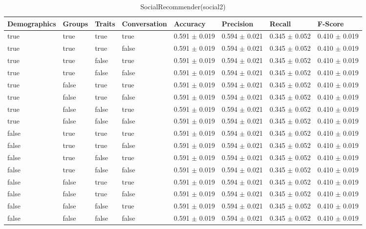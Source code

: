\clearpage
\begin{table}[h]
	\centering
	\begin{tabular}{|l|l|l|l|l|l|l|l|} %
	\hline
	Demographics & Groups & Traits & Conversation & Accuracy & Precision & Recall & F-Score \\ \hline
	true & true & true & true & 0.591	\( \pm \) 0.019	& 0.594	\( \pm \) 0.021	& 0.345	\( \pm \) 0.052	& 0.410	\( \pm \) 0.019	\\ \hline
	true & true & true & false & 0.591	\( \pm \) 0.019	& 0.594	\( \pm \) 0.021	& 0.345	\( \pm \) 0.052	& 0.410	\( \pm \) 0.019	\\ \hline
	true & true & false & true & 0.591	\( \pm \) 0.019	& 0.594	\( \pm \) 0.021	& 0.345	\( \pm \) 0.052	& 0.410	\( \pm \) 0.019	\\ \hline
	true & true & false & false & 0.591	\( \pm \) 0.019	& 0.594	\( \pm \) 0.021	& 0.345	\( \pm \) 0.052	& 0.410	\( \pm \) 0.019	\\ \hline
	true & false & true & true & 0.591	\( \pm \) 0.019	& 0.594	\( \pm \) 0.021	& 0.345	\( \pm \) 0.052	& 0.410	\( \pm \) 0.019	\\ \hline
	true & false & true & false & 0.591	\( \pm \) 0.019	& 0.594	\( \pm \) 0.021	& 0.345	\( \pm \) 0.052	& 0.410	\( \pm \) 0.019	\\ \hline
	true & false & false & true & 0.591	\( \pm \) 0.019	& 0.594	\( \pm \) 0.021	& 0.345	\( \pm \) 0.052	& 0.410	\( \pm \) 0.019	\\ \hline
	true & false & false & false & 0.591	\( \pm \) 0.019	& 0.594	\( \pm \) 0.021	& 0.345	\( \pm \) 0.052	& 0.410	\( \pm \) 0.019	\\ \hline
	false & true & true & true & 0.591	\( \pm \) 0.019	& 0.594	\( \pm \) 0.021	& 0.345	\( \pm \) 0.052	& 0.410	\( \pm \) 0.019	\\ \hline
	false & true & true & false & 0.591	\( \pm \) 0.019	& 0.594	\( \pm \) 0.021	& 0.345	\( \pm \) 0.052	& 0.410	\( \pm \) 0.019	\\ \hline
	false & true & false & true & 0.591	\( \pm \) 0.019	& 0.594	\( \pm \) 0.021	& 0.345	\( \pm \) 0.052	& 0.410	\( \pm \) 0.019	\\ \hline
	false & true & false & false & 0.591	\( \pm \) 0.019	& 0.594	\( \pm \) 0.021	& 0.345	\( \pm \) 0.052	& 0.410	\( \pm \) 0.019	\\ \hline
	false & false & true & true & 0.591	\( \pm \) 0.019	& 0.594	\( \pm \) 0.021	& 0.345	\( \pm \) 0.052	& 0.410	\( \pm \) 0.019	\\ \hline
	false & false & true & false & 0.591	\( \pm \) 0.019	& 0.594	\( \pm \) 0.021	& 0.345	\( \pm \) 0.052	& 0.410	\( \pm \) 0.019	\\ \hline
	false & false & false & true & 0.591	\( \pm \) 0.019	& 0.594	\( \pm \) 0.021	& 0.345	\( \pm \) 0.052	& 0.410	\( \pm \) 0.019	\\ \hline
	false & false & false & false & 0.591	\( \pm \) 0.019	& 0.594	\( \pm \) 0.021	& 0.345	\( \pm \) 0.052	& 0.410	\( \pm \) 0.019	\\ \hline
	\end{tabular}
	\caption{SocialRecommender(social2)}
	\label{tab:revpol}
\end{table}



